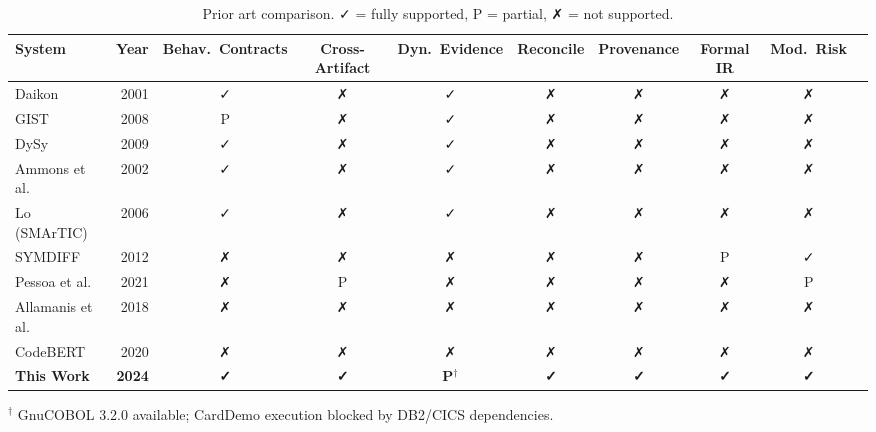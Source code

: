 \begin{table}[t]
\small
\centering
\caption{Prior art comparison. ✓ = fully supported, P = partial, ✗ = not supported.}
\label{table:prior_art}
\begin{tabular}{lrcccccccc}
\toprule
System & Year & Behav.\ Contracts & Cross-Artifact & Dyn.\ Evidence & Reconcile & Provenance & Formal IR & Mod.\ Risk \\
\midrule
Daikon & 2001 & ✓ & ✗ & ✓ & ✗ & ✗ & ✗ & ✗ \\
GIST & 2008 & P & ✗ & ✓ & ✗ & ✗ & ✗ & ✗ \\
DySy & 2009 & ✓ & ✗ & ✓ & ✗ & ✗ & ✗ & ✗ \\
Ammons et al. & 2002 & ✓ & ✗ & ✓ & ✗ & ✗ & ✗ & ✗ \\
Lo (SMArTIC) & 2006 & ✓ & ✗ & ✓ & ✗ & ✗ & ✗ & ✗ \\
SYMDIFF & 2012 & ✗ & ✗ & ✗ & ✗ & ✗ & P & ✓ \\
Pessoa et al. & 2021 & ✗ & P & ✗ & ✗ & ✗ & ✗ & P \\
Allamanis et al. & 2018 & ✗ & ✗ & ✗ & ✗ & ✗ & ✗ & ✗ \\
CodeBERT & 2020 & ✗ & ✗ & ✗ & ✗ & ✗ & ✗ & ✗ \\
\midrule
\textbf{This Work} & \textbf{2024} & \textbf{✓} & \textbf{✓} & \textbf{P$^\dagger$} & \textbf{✓} & \textbf{✓} & \textbf{✓} & \textbf{✓} \\
\bottomrule
\end{tabular}
\vspace{0.5em}
{\small $^\dagger$ GnuCOBOL 3.2.0 available; CardDemo execution blocked by DB2/CICS dependencies.}
\end{table}

